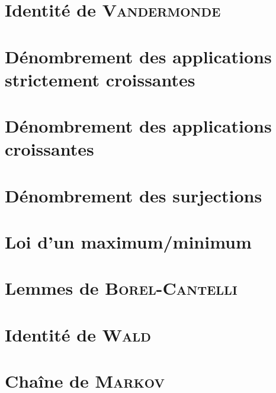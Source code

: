 \section{Identité de \textsc{Vandermonde}}


\section{Dénombrement des applications strictement croissantes}


\section{Dénombrement des applications croissantes}


\section{Dénombrement des surjections} \label{denombrement_surjections}


\section{Loi d'un maximum/minimum}


\section{Lemmes de \textsc{Borel-Cantelli}}


\section{Identité de \textsc{Wald}}


\section{Chaîne de \textsc{Markov}} \label{chaîne_markov}
% 

